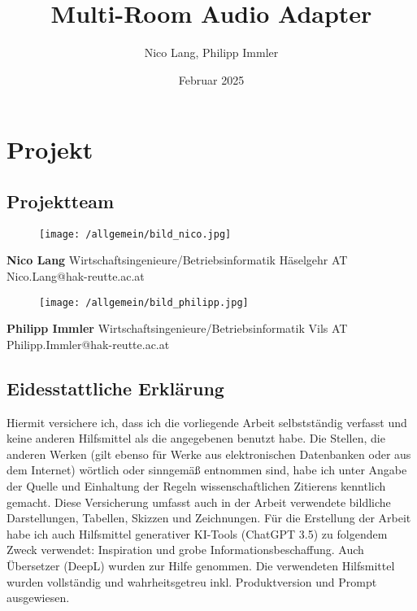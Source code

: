 \documentclass[11pt, twoside]{article}
\title{\textbf{Multi-Room Audio Adapter}}
\author{Nico Lang, Philipp Immler}
\date{Februar 2025}
\begin{document}
{}
\newpage
{}


\section*{Projekt}
\subsection*{Projektteam}
\begin{figure}[H]
	\texttt{[image: /allgemein/bild\_nico.jpg]}
\end{figure}
\textbf{Nico Lang}\newline
Wirtschaftsingenieure/Betriebsinformatik Häselgehr AT\newline
Nico.Lang@hak-reutte.ac.at\newline
\begin{figure}[H]
	\texttt{[image: /allgemein/bild\_philipp.jpg]}
\end{figure}
\noindent \textbf{Philipp Immler}\newline
Wirtschaftsingenieure/Betriebsinformatik Vils AT\newline
Philipp.Immler@hak-reutte.ac.at
\newpage
\subsection*{Eidesstattliche Erklärung}
Hiermit versichere ich, dass ich die vorliegende Arbeit selbstständig verfasst und keine anderen Hilfsmittel als die angegebenen benutzt habe. Die Stellen, die anderen Werken (gilt ebenso für Werke aus elektronischen Datenbanken oder aus dem Internet) wörtlich oder sinngemäß entnommen sind, habe ich unter Angabe der Quelle und Einhaltung der Regeln wissenschaftlichen Zitierens kenntlich gemacht. Diese Versicherung umfasst auch in der Arbeit verwendete bildliche Darstellungen, Tabellen, Skizzen und Zeichnungen. Für die Erstellung der Arbeit habe ich auch Hilfsmittel generativer KI-Tools (ChatGPT 3.5) zu folgendem Zweck verwendet: Inspiration und grobe Informationsbeschaffung. Auch Übersetzer (DeepL) wurden zur Hilfe genommen. Die verwendeten Hilfsmittel wurden vollständig und wahrheitsgetreu inkl. Produktversion und Prompt ausgewiesen.\\
\end{document}
